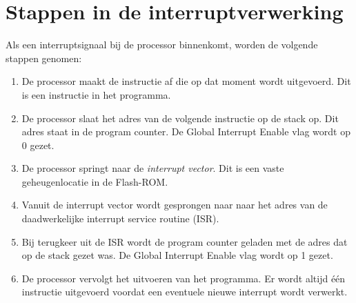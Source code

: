 \section{Stappen in de interruptverwerking}
Als een interruptsignaal bij de processor binnenkomt, worden de volgende
stappen genomen:
\begin{enumerate}
\item De processor maakt de instructie af die op dat moment wordt uitgevoerd.
      Dit is een instructie in het programma.
\item De processor slaat het adres van de volgende instructie op de stack op.
      Dit adres staat in de program counter. De Global Interrupt Enable vlag
      wordt op 0 gezet.
\item De processor springt naar de \textsl{interrupt vector}. Dit is een vaste
      geheugenlocatie in de Flash-ROM.
\item Vanuit de interrupt vector wordt gesprongen naar naar het adres van de
      daadwerkelijke interrupt service routine (ISR).
\item Bij terugkeer uit de ISR wordt de program counter geladen met de adres
      dat op de stack gezet was. De Global Interrupt Enable vlag wordt op 1
      gezet.
\item De processor vervolgt het uitvoeren van het programma. Er wordt altijd
      \'e\'en instructie uitgevoerd voordat een eventuele nieuwe interrupt
      wordt verwerkt.
\end{enumerate}

